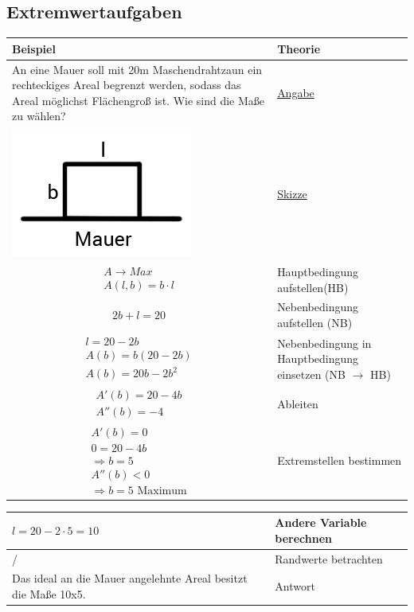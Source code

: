 \documentclass[../mainfile.tex]{subfiles}
\begin{document}
	\subsection{Extremwertaufgaben}
		\def\tabularxcolumn#1{m{#1}}
		\begin{tabularx}{\textwidth}{ | X | X |}
			\hline
			Beispiel & Theorie \\
			\hline 
			An eine Mauer soll mit 20m Maschendrahtzaun ein rechteckiges Areal begrenzt werden, sodass das Areal möglichst Flächengroß ist. Wie sind die Maße zu wählen? &  \underline{Angabe} \\
			\hline 
			\includegraphics[scale=0.4]{diff1_009_01.png} & \underline{Skizze} \\
			\hline
			\begin{gather*}
			A \rightarrow Max \\
			A(l, b) = b \cdot l
			\end{gather*}
			 &  Hauptbedingung aufstellen(HB)\\
			\hline
			\[2b+l=20\] & Nebenbedingung aufstellen (NB) \\
			\hline
			\begin{gather*}
			l = 20 - 2b \\
			A(b) = b(20-2b) \\
			A(b) = 20b - 2b^2  
			\end{gather*} & Nebenbedingung in Hauptbedingung einsetzen (NB $\rightarrow$ HB) \\
			\hline
			\begin{gather*}
			A'(b) = 20-4b \\
			A''(b)=-4
			\end{gather*} & Ableiten \\
		 	\hline
		 	\begin{gather*} 
		 	A'(b) = 0 \\
		 	0 = 20-4b \\
		 	\Longrightarrow b = 5 \\
		 	A''(b) < 0 \\
		 	\Longrightarrow b = 5 \text{ Maximum}
		 	\end{gather*} & Extremstellen bestimmen \\
		 	\hline
		 \end{tabularx}
	 	 \begin{tabularx}{\textwidth}{ | X | X |}
			\hline 
		 	$l = 20 - 2 \cdot 5 = 10$ & Andere Variable berechnen \\
		 	\hline
		 	/ & Randwerte betrachten \\
		 	\hline
		 	Das ideal an die Mauer angelehnte Areal besitzt die Maße 10x5. & Antwort \\
		 	\hline

		\end{tabularx}
\end{document}

